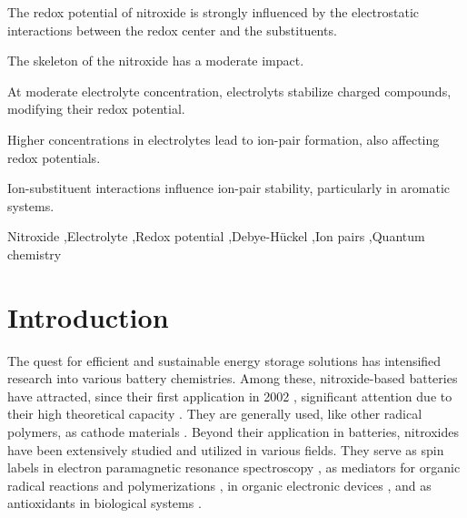 \documentclass[review,preprint]{elsarticle}
\begin{document}
\begin{frontmatter}
		\begin{highlights}
				\item The redox potential of nitroxide is strongly influenced by the electrostatic interactions between the redox center and the substituents.
				\item The skeleton of the nitroxide has a moderate impact.
				\item At moderate electrolyte concentration, electrolyts stabilize charged compounds, modifying their redox potential.
				\item Higher concentrations in electrolytes lead to ion-pair formation, also affecting redox potentials.
				\item Ion-substituent interactions influence ion-pair stability, particularly in aromatic systems.
		\end{highlights}
		
		\begin{keyword}
			Nitroxide 
			\sep Electrolyte 
			\sep Redox potential
			\sep Debye-Hückel 
			\sep Ion pairs 
			\sep Quantum chemistry
			
			
			
		\end{keyword}
		
	\end{frontmatter}
	
	
\section{Introduction}


The quest for efficient and sustainable energy storage solutions has intensified research into various battery chemistries. Among these, nitroxide-based batteries have attracted, since their first application in 2002 \cite{nakaharaRechargeableBatteriesOrganic2002}, significant attention due to their high theoretical capacity \cite{friebeSustainableEnergyStorage2019,ernouldNitroxidesBatteryrelatedApplications2021,keDesigningStrategiesAdvanced2023}. They are generally used, like other radical polymers, as cathode materials \cite{okaRadicalPolymersRechargeable2020a,assummaNewConductingCopolymer2020}. Beyond their application in batteries, nitroxides have been extensively studied and utilized in various fields. They serve as spin labels in electron paramagnetic resonance spectroscopy \cite{torricellaNitroxideSpinLabels2021}, as mediators for organic radical reactions and polymerizations \cite{tebbenNitroxidesApplicationsSynthesis2011,leifertOrganicSynthesisUsing2023}, in organic electronic devices \cite{jiAirStableOrganicRadicals2020,xieNitroxideRadicalPolymers2021}, and as antioxidants in biological systems  \cite{souleChemistryBiologyNitroxide2007,lewandowskiNitroxidesAntioxidantsAnticancer2017,prescottBiologicalRelevanceFree2017}.
\end{document}
